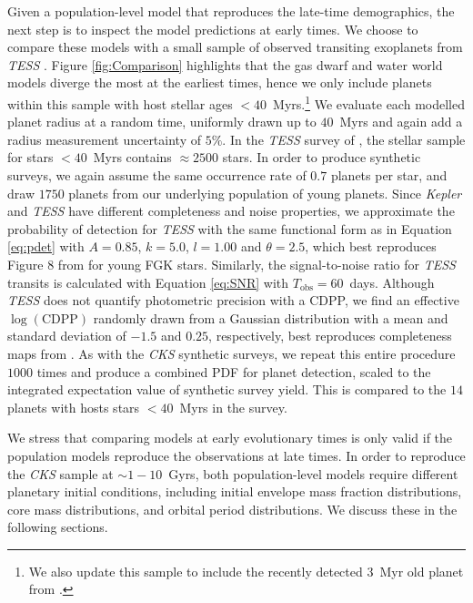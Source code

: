 \documentclass[fleqn,usenatbib]{mnras}
\begin{document}
Given a population-level model that reproduces the late-time demographics, the next step is to inspect the model predictions at early times. We choose to compare these models with a small sample of observed transiting exoplanets from \textit{TESS} \citep{Vach2024a}. Figure \ref{fig:Comparison} highlights that the gas dwarf and water world models diverge the most at the earliest times, hence we only include planets within this sample with host stellar ages $<40$~Myrs.\footnote{We also update this sample to include the recently detected $3$~Myr old planet from \citet{Barber2024}.} We evaluate each modelled planet radius at a random time, uniformly drawn up to $40$~Myrs and again add a radius measurement uncertainty of $5\%$. In the \textit{TESS} survey of \citet{Vach2024a}, the stellar sample for stars $<40$~Myrs contains $\approx 2500$ stars. In order to produce synthetic surveys, we again assume the same occurrence rate of $0.7$ planets per star, and draw $1750$ planets from our underlying population of young planets. Since \textit{Kepler} and \textit{TESS} have different completeness and noise properties, we approximate the probability of detection for \textit{TESS} with the same functional form as in Equation \ref{eq:pdet} with $A=0.85$, $k=5.0$, $l=1.00$ and $\theta=2.5$, which best reproduces Figure 8 from \citet{Vach2024a} for young FGK stars. Similarly, the signal-to-noise ratio for \textit{TESS} transits is calculated with Equation \ref{eq:SNR} with $T_\text{obs}=60$~days. Although \textit{TESS} does not quantify photometric precision with a CDPP, we find an effective $\log (\text{CDPP})$ randomly drawn from a Gaussian distribution with a mean and standard deviation of $-1.5$ and $0.25$, respectively, best reproduces completeness maps from \citet{Fernandes2022,Vach2024a}. As with the \textit{CKS} synthetic surveys, we repeat this entire procedure $1000$ times and produce a combined PDF for planet detection, scaled to the integrated expectation value of synthetic survey yield. This is compared to the $14$ planets with hosts stars $< 40$~Myrs in the \citet{Vach2024a} survey.

We stress that comparing models at early evolutionary times is only valid if the population models reproduce the observations at late times. In order to reproduce the \textit{CKS} sample at $\sim 1 - 10$~Gyrs, both population-level models require different planetary initial conditions, including initial envelope mass fraction distributions, core mass distributions, and orbital period distributions. We discuss these in the following sections. 
\end{document}
